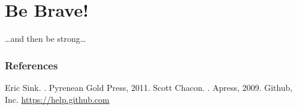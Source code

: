 \documentclass{beamer}
\begin{document}
\section{Be Brave!}
\begin{frame}

\ldots and then be strong\ldots
\end{frame}
% 
% 
% 

\begin{frame}[allowframebreaks]
  \frametitle<presentation>{References}    
  \begin{thebibliography}{10}    
  \beamertemplatebookbibitems
    Eric Sink.
    .
    \newblock Pyrenean Gold Press, 2011.
    Scott Chacon.
    .
    \newblock Apress, 2009.
  \beamertemplatearticlebibitems
    Github, Inc.
    \newblock \url{https://help.github.com}
  \end{thebibliography}
\end{frame}
\end{document}
